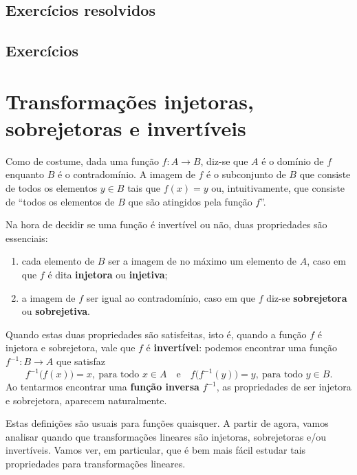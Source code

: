\subsection*{Exercícios resolvidos}

\construirExeresol

\subsection*{Exercícios}

\construirExer


\section{Transformações injetoras, sobrejetoras e invertíveis}


Como de costume, dada uma função $f: A \to B$, diz-se que $A$ é o domínio de $f$ enquanto $B$ é o contradomínio. A imagem de $f$ é o subconjunto de $B$ que consiste de todos os elementos $y \in B$ tais que $f(x) = y$ ou, intuitivamente, que consiste de ``todos os elementos de $B$ que são atingidos pela função $f$''.

Na hora de decidir se uma função é invertível ou não, duas propriedades são essenciais:
\begin{enumerate}[$1)$]
  \item cada elemento de $B$ ser a imagem de no máximo um elemento de $A$, caso em que $f$ é dita \textbf{injetora} ou \textbf{injetiva};
  \item a imagem de $f$ ser igual ao contradomínio, caso em que $f$ diz-se \textbf{sobrejetora} ou \textbf{sobrejetiva}.
\end{enumerate}

Quando estas duas propriedades são satisfeitas, isto é, quando a função $f$ é injetora e sobrejetora, vale que $f$ é \textbf{invertível}: podemos encontrar uma função $f^{-1} : B \to A$ que satisfaz
\begin{equation}
f^{-1}\big( f (x)\big) = x, \ \text{para todo } x \in A  \quad \text{e} \quad f\big( f^{-1} (y)\big) = y, \ \text{para todo } y \in B.
\end{equation} Ao tentarmos encontrar uma \textbf{função inversa} $f^{-1}$, as propriedades de ser injetora e sobrejetora, aparecem naturalmente.

Estas definições são usuais para funções quaisquer. A partir de agora, vamos analisar quando que transformações lineares são injetoras, sobrejetoras e/ou invertíveis. Vamos ver, em particular, que é bem mais fácil estudar tais propriedades para transformações lineares.


